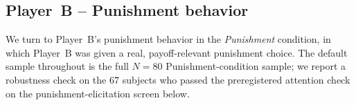 %
%

\subsection*{Player~B -- Punishment behavior} \label{sec:result2}

We turn to Player~B's punishment behavior in the \textit{Punishment} condition, in which Player~B was given a real, payoff-relevant punishment choice. The default sample throughout is the full $N=80$ Punishment-condition sample; we report a robustness check on the $67$ subjects who passed the preregistered attention check on the punishment-elicitation screen below.

